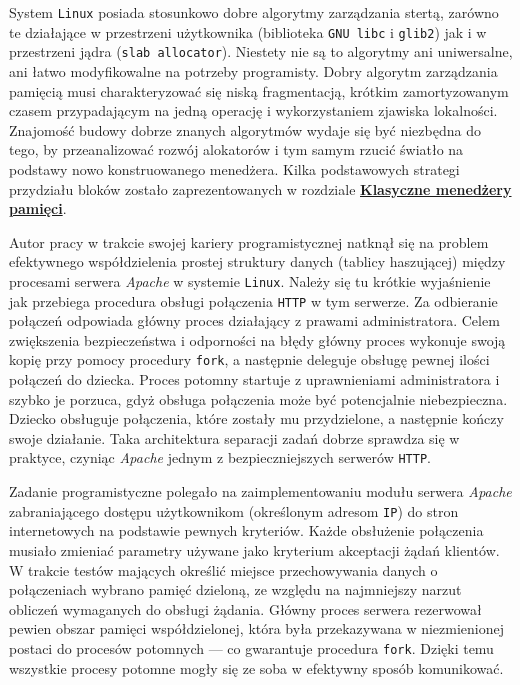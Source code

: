 \documentclass[12pt,a4paper,titlepage,twoside]{mwart}
\begin{document}
System \texttt{Linux} posiada stosunkowo dobre algorytmy zarządzania stertą,
zarówno te działające w przestrzeni użytkownika (biblioteka \texttt{GNU libc} i
\texttt{glib2}) jak i w przestrzeni jądra (\texttt{slab allocator}). Niestety
nie są to algorytmy ani uniwersalne, ani łatwo modyfikowalne na potrzeby
programisty. Dobry algorytm zarządzania pamięcią musi charakteryzować się niską
fragmentacją, krótkim zamortyzowanym czasem przypadającym na jedną operację i
wykorzystaniem zjawiska lokalności. Znajomość budowy dobrze znanych algorytmów
wydaje się być niezbędna do tego, by przeanalizować rozwój alokatorów i tym
samym rzucić światło na podstawy nowo konstruowanego menedżera. Kilka
podstawowych strategi przydziału bloków zostało zaprezentowanych w rozdziale
\hyperlink{Klasyka}{\textbf{Klasyczne menedżery pamięci}}.

Autor pracy w trakcie swojej kariery programistycznej natknął się na problem
efektywnego współdzielenia prostej struktury danych (tablicy haszującej) między
procesami serwera \textit{Apache} w systemie \texttt{Linux}.  Należy się tu
krótkie wyjaśnienie jak przebiega procedura obsługi połączenia \verb+HTTP+ w
tym serwerze. Za odbieranie połączeń odpowiada główny proces działający z
prawami administratora. Celem zwiększenia bezpieczeństwa i odporności na błędy
główny proces wykonuje swoją kopię przy pomocy procedury \verb+fork+, a
następnie deleguje obsługę pewnej ilości połączeń do dziecka.  Proces potomny
startuje z uprawnieniami administratora i szybko je porzuca, gdyż obsługa
połączenia może być potencjalnie niebezpieczna. Dziecko obsługuje połączenia,
które zostały mu przydzielone, a następnie kończy swoje działanie.  Taka
architektura separacji zadań dobrze sprawdza się w praktyce, czyniąc
\textit{Apache} jednym z bezpieczniejszych serwerów \texttt{HTTP}.

Zadanie programistyczne polegało na zaimplementowaniu modułu serwera
\textit{Apache} zabraniającego dostępu użytkownikom (określonym adresom
\texttt{IP}) do stron internetowych na podstawie pewnych kryteriów. Każde
obsłużenie połączenia musiało zmieniać parametry używane jako kryterium
akceptacji żądań klientów. W trakcie testów mających określić miejsce
przechowywania danych o połączeniach wybrano pamięć dzieloną, ze względu na
najmniejszy narzut obliczeń wymaganych do obsługi żądania. Główny proces
serwera rezerwował pewien obszar pamięci współdzielonej, która była
przekazywana w niezmienionej postaci do procesów potomnych --- co gwarantuje
procedura \verb+fork+. Dzięki temu wszystkie procesy potomne mogły się ze soba
w efektywny sposób komunikować.
\end{document}
